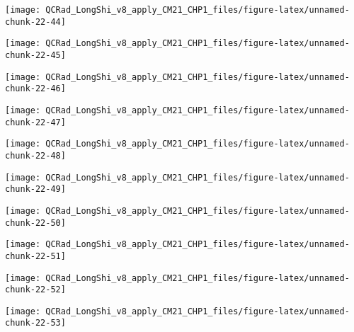 \documentclass[
  10pt,
  a4paper,oneside]{article}
\begin{document}
\begin{center}\texttt{[image: QCRad\_LongShi\_v8\_apply\_CM21\_CHP1\_files/figure-latex/unnamed-chunk-22-44]} \end{center}

\begin{center}\texttt{[image: QCRad\_LongShi\_v8\_apply\_CM21\_CHP1\_files/figure-latex/unnamed-chunk-22-45]} \end{center}

\begin{center}\texttt{[image: QCRad\_LongShi\_v8\_apply\_CM21\_CHP1\_files/figure-latex/unnamed-chunk-22-46]} \end{center}

\begin{center}\texttt{[image: QCRad\_LongShi\_v8\_apply\_CM21\_CHP1\_files/figure-latex/unnamed-chunk-22-47]} \end{center}

\begin{center}\texttt{[image: QCRad\_LongShi\_v8\_apply\_CM21\_CHP1\_files/figure-latex/unnamed-chunk-22-48]} \end{center}

\begin{center}\texttt{[image: QCRad\_LongShi\_v8\_apply\_CM21\_CHP1\_files/figure-latex/unnamed-chunk-22-49]} \end{center}

\begin{center}\texttt{[image: QCRad\_LongShi\_v8\_apply\_CM21\_CHP1\_files/figure-latex/unnamed-chunk-22-50]} \end{center}

\begin{center}\texttt{[image: QCRad\_LongShi\_v8\_apply\_CM21\_CHP1\_files/figure-latex/unnamed-chunk-22-51]} \end{center}

\begin{center}\texttt{[image: QCRad\_LongShi\_v8\_apply\_CM21\_CHP1\_files/figure-latex/unnamed-chunk-22-52]} \end{center}

\begin{center}\texttt{[image: QCRad\_LongShi\_v8\_apply\_CM21\_CHP1\_files/figure-latex/unnamed-chunk-22-53]} \end{center}
\end{document}
